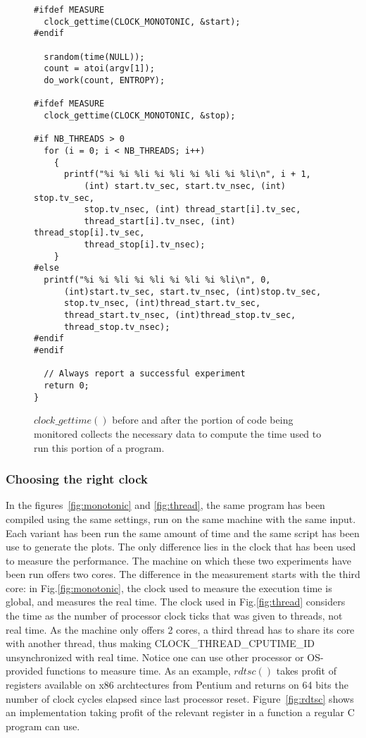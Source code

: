 \begin{figure}
\centering
\begin{lstlisting}
#ifdef MEASURE
  clock_gettime(CLOCK_MONOTONIC, &start);
#endif

  srandom(time(NULL));
  count = atoi(argv[1]);
  do_work(count, ENTROPY);

#ifdef MEASURE
  clock_gettime(CLOCK_MONOTONIC, &stop);

#if NB_THREADS > 0
  for (i = 0; i < NB_THREADS; i++)
    {
      printf("%i %i %li %i %li %i %li %i %li\n", i + 1,
          (int) start.tv_sec, start.tv_nsec, (int) stop.tv_sec,
          stop.tv_nsec, (int) thread_start[i].tv_sec,
          thread_start[i].tv_nsec, (int) thread_stop[i].tv_sec,
          thread_stop[i].tv_nsec);
    }
#else
  printf("%i %i %li %i %li %i %li %i %li\n", 0,
      (int)start.tv_sec, start.tv_nsec, (int)stop.tv_sec,
      stop.tv_nsec, (int)thread_start.tv_sec,
      thread_start.tv_nsec, (int)thread_stop.tv_sec,
      thread_stop.tv_nsec);
#endif
#endif

  // Always report a successful experiment
  return 0;
}
\end{lstlisting}
\caption{$clock\_gettime()$ before and after the portion of code being monitored collects the necessary data to compute the time used to run this portion of a program.}
\label{fig:instrumentation}
\end{figure}

\subsubsection{Choosing the right clock}
\label{app:clock}

In the figures~\ref{fig:monotonic} and \ref{fig:thread}, the same program has been compiled using the same settings, run on the same machine with the same input. Each variant has been run the same amount of time and the same script has been use to generate the plots. The only difference lies in the clock that has been used to measure the performance. The machine on which these two experiments have been run offers two cores. The difference in the measurement starts with the third core: in Fig.\ref{fig:monotonic}, the clock used to measure the execution time is global, and measures the real time. The clock used in Fig.\ref{fig:thread} considers the time as the number of processor clock ticks that was given to threads, not real time. As the machine only offers 2 cores, a third thread has to share its core with another thread, thus making CLOCK\_THREAD\_CPUTIME\_ID unsynchronized with real time. Notice one can use other processor or OS-provided functions to measure time. As an example, $rdtsc()$ takes profit of registers available on x86 archtectures from Pentium and returns on 64 bits the number of clock cycles elapsed since last processor reset. Figure~\ref{fig:rdtsc} shows an implementation taking profit of the relevant register in a function a regular C program can use.


